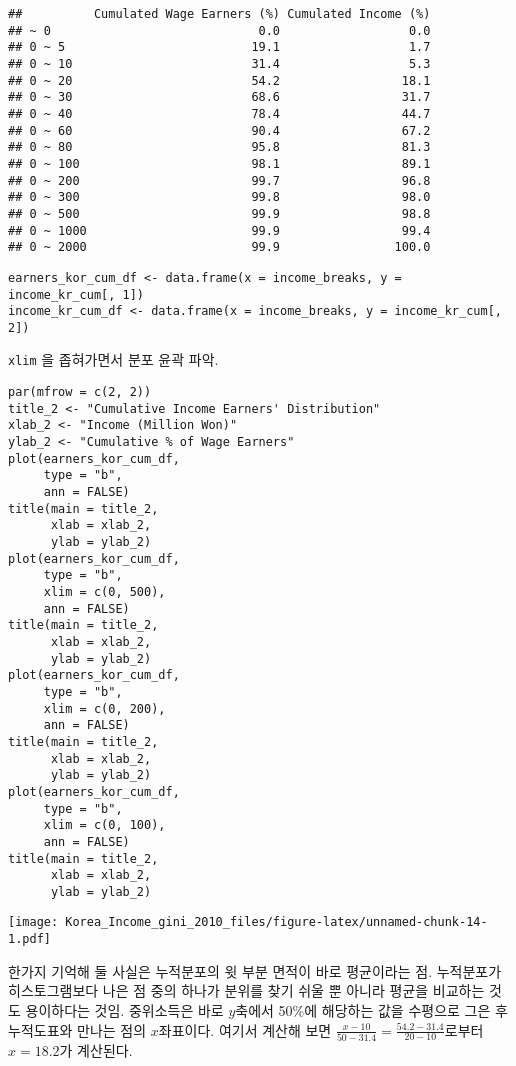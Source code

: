 \documentclass[
]{article}
\begin{document}
\begin{verbatim}
##          Cumulated Wage Earners (%) Cumulated Income (%)
## ~ 0                             0.0                  0.0
## 0 ~ 5                          19.1                  1.7
## 0 ~ 10                         31.4                  5.3
## 0 ~ 20                         54.2                 18.1
## 0 ~ 30                         68.6                 31.7
## 0 ~ 40                         78.4                 44.7
## 0 ~ 60                         90.4                 67.2
## 0 ~ 80                         95.8                 81.3
## 0 ~ 100                        98.1                 89.1
## 0 ~ 200                        99.7                 96.8
## 0 ~ 300                        99.8                 98.0
## 0 ~ 500                        99.9                 98.8
## 0 ~ 1000                       99.9                 99.4
## 0 ~ 2000                       99.9                100.0
\end{verbatim}

\begin{verbatim}
earners_kor_cum_df <- data.frame(x = income_breaks, y = income_kr_cum[, 1])
income_kr_cum_df <- data.frame(x = income_breaks, y = income_kr_cum[, 2])
\end{verbatim}

\texttt{xlim} 을 좁혀가면서 분포 윤곽 파악.

\begin{verbatim}
par(mfrow = c(2, 2))
title_2 <- "Cumulative Income Earners' Distribution"
xlab_2 <- "Income (Million Won)"
ylab_2 <- "Cumulative % of Wage Earners"
plot(earners_kor_cum_df, 
     type = "b", 
     ann = FALSE)
title(main = title_2, 
      xlab = xlab_2, 
      ylab = ylab_2)
plot(earners_kor_cum_df, 
     type = "b", 
     xlim = c(0, 500), 
     ann = FALSE)
title(main = title_2, 
      xlab = xlab_2, 
      ylab = ylab_2)
plot(earners_kor_cum_df, 
     type = "b", 
     xlim = c(0, 200), 
     ann = FALSE)
title(main = title_2, 
      xlab = xlab_2, 
      ylab = ylab_2)
plot(earners_kor_cum_df, 
     type = "b", 
     xlim = c(0, 100), 
     ann = FALSE)
title(main = title_2, 
      xlab = xlab_2, 
      ylab = ylab_2)
\end{verbatim}

\texttt{[image: Korea\_Income\_gini\_2010\_files/figure-latex/unnamed-chunk-14-1.pdf]}

한가지 기억해 둘 사실은 누적분포의 윗 부분 면적이 바로 평균이라는 점.
누적분포가 히스토그램보다 나은 점 중의 하나가 분위를 찾기 쉬울 뿐 아니라
평균을 비교하는 것도 용이하다는 것임. 중위소득은 바로 \(y\)축에서 50\%에
해당하는 값을 수평으로 그은 후 누적도표와 만나는 점의 \(x\)좌표이다.
여기서 계산해 보면
\(\frac{x-10}{50 - 31.4} = \frac{54.2 - 31.4}{20 - 10}\)로부터
\(x = 18.2\)가 계산된다.
\end{document}
